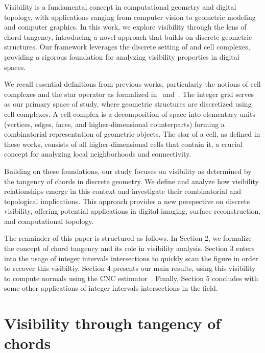 \documentclass[runningheads]{llncs}
\begin{document}
    
    Visibility is a fundamental concept in computational geometry and digital topology, with applications ranging from computer vision to geometric modeling and computer graphics.
    In this work, we explore visibility through the lens of chord tangency, introducing a novel approach that builds on discrete geometric structures.
    Our framework leverages the discrete setting of and cell complexes, providing a rigorous foundation for analyzing visibility properties in digital spaces.


    
    We recall essential definitions from previous works, particularly the notions of cell complexes and the star operator as formalized in~\cite{lachaud:2021-dgmm} and~\cite{lachaud:2022-jmiv}.
    The integer grid serves as our primary space of study, where geometric structures are discretized using cell complexes.
    A cell complex is a decomposition of space into elementary units (vertices, edges, faces, and higher-dimensional counterparts) forming a combinatorial representation of geometric objects.
    The star of a cell, as defined in these works, consists of all higher-dimensional cells that contain it, a crucial concept for analyzing local neighborhoods and connectivity.

    Building on these foundations, our study focuses on visibility as determined by the tangency of chords in discrete geometry.
    We define and analyze how visibility relationships emerge in this context and investigate their combinatorial and topological implications.
    This approach provides a new perspective on discrete visibility, offering potential applications in digital imaging, surface reconstruction, and computational topology.

    The remainder of this paper is structured as follows.
    In Section 2, we formalize the concept of chord tangency and its role in visibility analysis.
    Section 3 enters into the usage of integer intervals intersections to quickly scan the figure in order to recover this visibiltiy.
    Section 4 presents our main results, using this visibility to compute normals using the CNC estimator~\cite{lachaud:2022-dcg}.
    Finally, Section 5 concludes with some other applications of integer intervals intersections in the field.




    \section{Visibility through tangency of chords}
\end{document}

